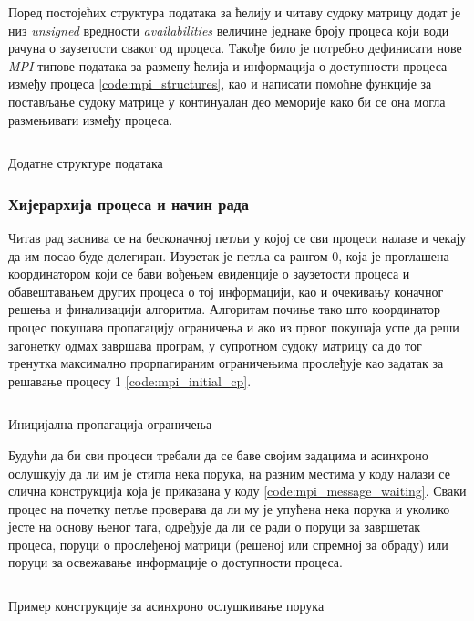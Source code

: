 Поред постојећих структура података за ћелију и читаву судоку матрицу додат је низ \textit{unsigned} вредности \textit{availabilities} величине једнаке броју процеса који води рачуна о заузетости сваког од процеса. Такође било је потребно дефинисати нове \textit{MPI} типове података за размену ћелија и информација о доступности процеса између процеса \ref{code:mpi_structures}, као и написати помоћне функције за постављање судоку матрице у континуалан део меморије како би се она могла размењивати између процеса.

\begin{listing}[H]
\inputminted{c}{kodovi/mpi_structures.c}
\caption{Додатне структуре података}
\label{code:mpi_structures}
\end{listing}

\subsubsection{Хијерархија процеса и начин рада}

Читав рад заснива се на бесконачној петљи у којој се сви процеси налазе и чекају да им посао буде делегиран. Изузетак је петља са рангом 0, која је проглашена координатором који се бави вођењем евиденције о заузетости процеса и обавештавањем других процеса о тој информацији, као и очекивању коначног решења и финализацији алгоритма. Алгоритам почиње тако што координатор процес покушава пропагацију ограничења и ако из првог покушаја успе да реши загонетку одмах завршава програм, у супротном судоку матрицу са до тог тренутка максимално прорпагираним ограничењима прослеђује као задатак за решавање процесу 1 \ref{code:mpi_initial_cp}. 

\begin{listing}[H]
\inputminted{c}{kodovi/mpi_initial_cp.c}
\caption{Иницијална пропагација ограничења}
\label{code:mpi_initial_cp}
\end{listing}

Будући да би сви процеси требали да се баве својим задацима и асинхроно ослушкују да ли им је стигла нека порука, на разним местима у коду налази се слична конструкција која је приказана у коду \ref{code:mpi_message_waiting}. Сваки процес на почетку петље проверава да ли му је упућена нека порука и уколико јесте на основу њеног тага, одређује да ли се ради о поруци за завршетак процеса, поруци о прослеђеној матрици (решеној или спремној за обраду) или поруци за освежавање информације о доступности процеса.

\begin{listing}[H]
\inputminted{c}{kodovi/mpi_message_waiting.c}
\caption{Пример конструкције за  асинхроно ослушкивање порука}
\label{code:mpi_message_waiting}
\end{listing}

